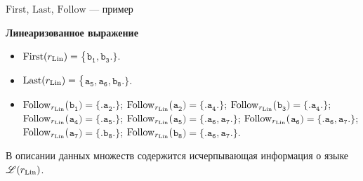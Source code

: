 \documentclass[mathserif]{beamer}
\newcommand{\Lang}{\mathscr{L}} %
\def\First{\mathrm{First}} %
\def\Last{\mathrm{Last}}
\def\Follow{\mathrm{Follow}}
\def\regexpstr#1{\mathtt{#1}}%
\begin{document}
\begin{frame}{$\First$, $\Last$, $\Follow$ --- пример}
{    \begin{exampleblock}{\bf Линеаризованное выражение}
        \begin{itemize}
            \item $\First(r_{\rm Lin})=\bigl\lbrace\bigr.${}$\regexpstr{b_{1}},\regexpstr{b_{3}}${}$\bigl.\bigr\rbrace$. %
            \item $\Last(r_{\rm Lin})=\bigl\lbrace\bigr.${}$\regexpstr{a_{5}},\regexpstr{a_{6}},\regexpstr{b_{8}}${}$\bigl.\bigr\rbrace$. %
            \item $\Follow_{r_{\rm Lin}}(${}$\regexpstr{b_{1}}${}$)=\bigl\lbrace\bigr.${}$\regexpstr{a_{2}}${}$\bigl.\bigr\rbrace$; $\Follow_{r_{\rm Lin}}(${}$\regexpstr{a_{2}}${}$)=\bigl\lbrace\bigr.${}$\regexpstr{a_{4}}${}$\bigl.\bigr\rbrace$; $\Follow_{r_{\rm Lin}}(${}$\regexpstr{b_{3}}${}$)=\bigl\lbrace\bigr.${}$\regexpstr{a_{4}}${}$\bigl.\bigr\rbrace$; $\Follow_{r_{\rm Lin}}(${}$\regexpstr{a_{4}}${}$)=\bigl\lbrace\bigr.${}$\regexpstr{a_{5}}${}$\bigl.\bigr\rbrace$; $\Follow_{r_{\rm Lin}}(${}$\regexpstr{a_{5}}${}$)=\bigl\lbrace\bigr.${}$\regexpstr{a_{6}},\regexpstr{a_{7}}${}$\bigl.\bigr\rbrace$; $\Follow_{r_{\rm Lin}}(${}$\regexpstr{a_{6}}${}$)=\bigl\lbrace\bigr.${}$\regexpstr{a_{6}},\regexpstr{a_{7}}${}$\bigl.\bigr\rbrace$; $\Follow_{r_{\rm Lin}}(${}$\regexpstr{a_{7}}${}$)=\bigl\lbrace\bigr.${}$\regexpstr{b_{8}}${}$\bigl.\bigr\rbrace$; $\Follow_{r_{\rm Lin}}(${}$\regexpstr{b_{8}}${}$)=\bigl\lbrace\bigr.${}$\regexpstr{a_{6}},\regexpstr{a_{7}}${}$\bigl.\bigr\rbrace$. %
        \end{itemize}
    \end{exampleblock}
    В описании данных множеств содержится исчерпывающая информация о языке $\Lang(r_{\rm Lin})$. %
    }
\end{frame}
\end{document}
